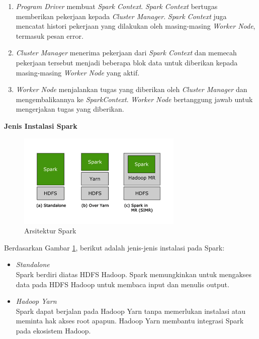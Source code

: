 \documentclass[a4paper,twoside]{article}
\begin{document}
\begin{enumerate}
\begin{enumerate}

\item
\textit{Program Driver} membuat \textit{Spark Context}. \textit{Spark Context} bertugas memberikan pekerjaan kepada \textit{Cluster Manager}. \textit{Spark Context} juga mencatat histori pekerjaan yang dilakukan oleh masing-masing \textit{Worker Node}, termasuk pesan error.

\item
\textit{Cluster Manager} menerima pekerjaan dari \textit{Spark Context} dan memecah pekerjaan tersebut menjadi beberapa blok data untuk diberikan kepada masing-masing \textit{Worker Node} yang aktif.

\item
\textit{Worker Node} menjalankan tugas yang diberikan oleh \textit{Cluster Manager} dan mengembalikannya ke \textit{SparkContext}. \textit{Worker Node} bertanggung jawab untuk mengerjakan tugas yang diberikan. 

\end{enumerate}

\vspace{0.2cm}
\textbf{Jenis Instalasi Spark}

\begin{figure}[H]
	\centering
	\includegraphics[scale=0.78]{arsitektur_spark}
	\caption{Arsitektur Spark}
	\label{fig:arsitektur_spark}
\end{figure}

Berdasarkan Gambar \ref{fig:arsitektur_spark}, berikut adalah jenis-jenis instalasi pada Spark:

\begin{itemize}
\item \textit{Standalone}\\  
Spark berdiri diatas HDFS Hadoop. Spark memungkinkan untuk mengakses data pada HDFS Hadoop untuk membaca input dan menulis output.

\item \textit{Hadoop Yarn}\\
Spark dapat berjalan pada Hadoop Yarn tanpa memerlukan instalasi atau meminta hak akses root apapun. Hadoop Yarn membantu integrasi Spark pada ekosistem Hadoop.


\end{itemize}
\end{enumerate}
\end{document}
